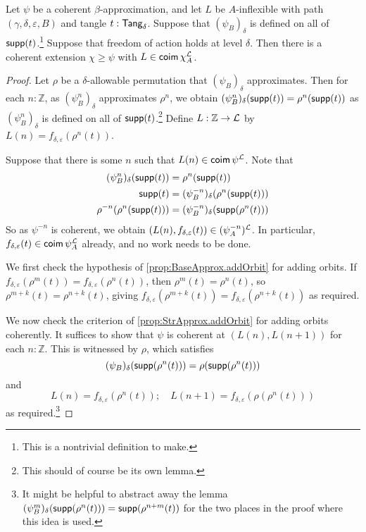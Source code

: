 \begin{proposition}
  \label{prop:StrApprox.addInflexible}
  Let \( \psi \) be a coherent \( \beta \)-approximation, and let \( L \) be \( A \)-inflexible with path \( (\gamma, \delta, \varepsilon, B) \) and tangle \( t : \mathsf{Tang}_\delta \).
  Suppose that \( (\psi_B)_\delta \) is defined on all of \( \operatorname{\mathsf{supp}}(t) \).\footnote{This is a nontrivial definition to make.}
  Suppose that freedom of action holds at level \( \delta \).
  Then there is a coherent extension \( \chi \geq \psi \) with \( L \in \operatorname{\mathsf{coim}} \chi_A^{\mathcal L} \).
\end{proposition}
\begin{proof}
  Let \( \rho \) be a \( \delta \)-allowable permutation that \( (\psi_B)_\delta \) approximates.
  Then for each \( n : \mathbb Z \), as \( (\psi^n_B)_\delta \) approximates \( \rho^n \), we obtain \( (\psi^n_B)_\delta(\operatorname{\mathsf{supp}}(t)) = \rho^n(\operatorname{\mathsf{supp}}(t)) \) as \( (\psi^n_B)_\delta \) is defined on all of \( \operatorname{\mathsf{supp}}(t) \).\footnote{This should of course be its own lemma.}
  Define \( L : \mathbb Z \to {\mathcal L} \) by \( L(n) = f_{\delta,\varepsilon}(\rho^n(t)) \).

  Suppose that there is some \( n \) such that \( L(n) \in \operatorname{\mathsf{coim}} \psi^{\mathcal L} \).
  Note that
  \begin{align*}
    (\psi^n_B)_\delta(\operatorname{\mathsf{supp}}(t)) &= \rho^n(\operatorname{\mathsf{supp}}(t)) \\
    \operatorname{\mathsf{supp}}(t) &= (\psi^{-n}_B)_\delta(\rho^n(\operatorname{\mathsf{supp}}(t))) \\
    \rho^{-n}(\rho^n(\operatorname{\mathsf{supp}}(t))) &= (\psi^{-n}_B)_\delta(\operatorname{\mathsf{supp}}(\rho^n(t)))
  \end{align*}
  So as \( \psi^{-n} \) is coherent, we obtain \( (L(n), f_{\delta,\varepsilon}(t)) \in (\psi^{-n}_A)^{\mathcal L} \).
  In particular, \( f_{\delta,\varepsilon}(t) \in \operatorname{\mathsf{coim}} \psi_A^{\mathcal L} \) already, and no work needs to be done.

  We first check the hypothesis of \cref{prop:BaseApprox.addOrbit} for adding orbits.
  If \( f_{\delta,\varepsilon}(\rho^m(t)) = f_{\delta,\varepsilon}(\rho^n(t)) \), then \( \rho^m(t) = \rho^n(t) \), so \( \rho^{m+k}(t) = \rho^{n+k}(t) \), giving \( f_{\delta,\varepsilon}(\rho^{m+k}(t)) = f_{\delta,\varepsilon}(\rho^{n+k}(t)) \) as required.

  We now check the criterion of \cref{prop:StrApprox.addOrbit} for adding orbits coherently.
  It suffices to show that \( \psi \) is coherent at \( (L(n), L(n+1)) \) for each \( n : \mathbb Z \).
  This is witnessed by \( \rho \), which satisfies
  \[ (\psi_B)_\delta(\operatorname{\mathsf{supp}}(\rho^n(t))) = \rho(\operatorname{\mathsf{supp}}(\rho^n(t))) \]
  and
  \[ L(n) = f_{\delta,\varepsilon}(\rho^n(t));\quad L(n+1) = f_{\delta,\varepsilon}(\rho(\rho^n(t))) \]
  as required.\footnote{It might be helpful to abstract away the lemma \( (\psi^m_B)_\delta(\operatorname{\mathsf{supp}}(\rho^n(t))) = \operatorname{\mathsf{supp}}(\rho^{n+m}(t)) \) for the two places in the proof where this idea is used.}
\end{proof}
